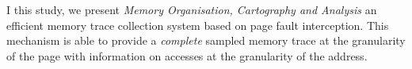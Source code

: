 I this study, we present \emph{Memory Organisation, Cartography and Analysis}
an efficient memory trace collection system based on page fault interception.
This mechanism is able to provide a \emph{complete} sampled memory trace at
the granularity of the page with information on accesses at the granularity of
the address.

